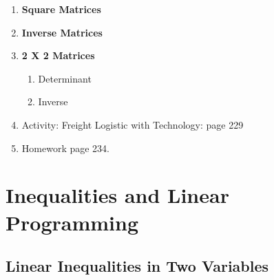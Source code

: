 \documentclass[12pt]{amsart}
\begin{document}
\begin{enumerate}
\vspace{4in}

	
	\item \textbf{Square Matrices}
	
	\item \textbf{Inverse Matrices}


	\item \textbf{ 2 X 2 Matrices}
		
		
		\begin{enumerate}
		
			\item Determinant 
		
			\item Inverse \\
		
		\end{enumerate}

\item Activity: Freight Logistic with Technology: page 229\\

\item Homework page 234.\\

\end{enumerate}


\newpage
\section{Inequalities and Linear Programming}


\subsection{Linear Inequalities in Two Variables}  
\end{document}
